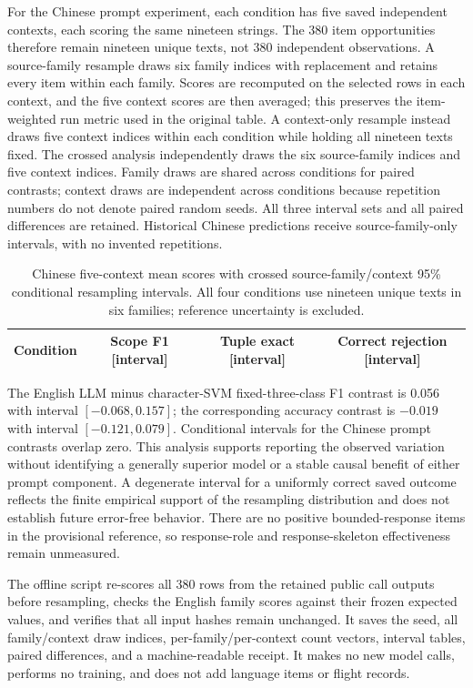 For the Chinese prompt experiment, each condition has five saved independent contexts, each scoring the same nineteen strings. The 380 item opportunities therefore remain nineteen unique texts, not 380 independent observations. A source-family resample draws six family indices with replacement and retains every item within each family. Scores are recomputed on the selected rows in each context, and the five context scores are then averaged; this preserves the item-weighted run metric used in the original table. A context-only resample instead draws five context indices within each condition while holding all nineteen texts fixed. The crossed analysis independently draws the six source-family indices and five context indices. Family draws are shared across conditions for paired contrasts; context draws are independent across conditions because repetition numbers do not denote paired random seeds. All three interval sets and all paired differences are retained. Historical Chinese predictions receive source-family-only intervals, with no invented repetitions.

\begin{table}[htbp]
\caption{Chinese five-context mean scores with crossed source-family/context 95\% conditional resampling intervals. All four conditions use nineteen unique texts in six families; reference uncertainty is excluded.}
\label{tab:chinese-conditional-intervals}
\centering\footnotesize
\begin{tabularx}{\textwidth}{Yccc}
\toprule
Condition & Scope F1 [interval] & Tuple exact [interval] & Correct rejection [interval] \\
\midrule

\bottomrule
\end{tabularx}
\end{table}

The English LLM minus character-SVM fixed-three-class F1 contrast is 0.056 with interval $[-0.068,0.157]$; the corresponding accuracy contrast is $-0.019$ with interval $[-0.121,0.079]$. Conditional intervals for the Chinese prompt contrasts overlap zero. This analysis supports reporting the observed variation without identifying a generally superior model or a stable causal benefit of either prompt component. A degenerate interval for a uniformly correct saved outcome reflects the finite empirical support of the resampling distribution and does not establish future error-free behavior. There are no positive bounded-response items in the provisional reference, so response-role and response-skeleton effectiveness remain unmeasured.

The offline script re-scores all 380 rows from the retained public call outputs before resampling, checks the English family scores against their frozen expected values, and verifies that all input hashes remain unchanged. It saves the seed, all family/context draw indices, per-family/per-context count vectors, interval tables, paired differences, and a machine-readable receipt. It makes no new model calls, performs no training, and does not add language items or flight records.
